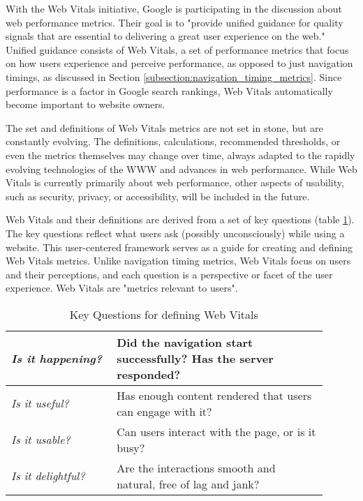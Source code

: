 
With the Web Vitals initiative, Google is participating in the discussion about web performance metrics.
Their goal is to "provide unified guidance for quality signals that are essential to delivering a great user experience on the web." %
Unified guidance consists of Web Vitals, a set of performance metrics that focus on how users experience and perceive performance, as opposed to just navigation timings, as discussed in Section \ref{subsection:navigation_timing_metrics}.
Since performance is a factor in Google search rankings, Web Vitals automatically become important to website owners. %


The set and definitions of Web Vitals metrics are not set in stone, but are constantly evolving.
The definitions, calculations, recommended thresholds, or even the metrics themselves may change over time, always adapted to the rapidly evolving technologies of the WWW and advances in web performance. %
While Web Vitals is currently primarily about web performance, other aspects of usability, such as security, privacy, or accessibility, will be included in the future. %


Web Vitals and their definitions are derived from a set of key questions (table \ref{table:web_vitals_key_questions}).
The key questions reflect what users ask (possibly unconsciously) while using a website. 
This user-centered framework serves as a guide for creating and defining Web Vitals metrics.
Unlike navigation timing metrics, Web Vitals focus on users and their perceptions, and each question is a perspective or facet of the user experience.
Web Vitals are "metrics relevant to users". %


\begin{table}[h]
	\small
	\centering
	\begin{tabular}{ p{0.3\linewidth} | p{0.6\linewidth} }
	\textit{Is it happening?} & Did the navigation start successfully? Has the server responded? \\
	\hline
	\textit{Is it useful?} & Has enough content rendered that users can engage with it? \\
	\hline
	\textit{Is it usable?} & Can users interact with the page, or is it busy? \\
	\hline
	\textit{Is it delightful?} & Are the interactions smooth and natural, free of lag and jank? \\
	\end{tabular}
	\medskip
	\caption{Key Questions for defining Web Vitals}
	\label{table:web_vitals_key_questions}
\end{table}


